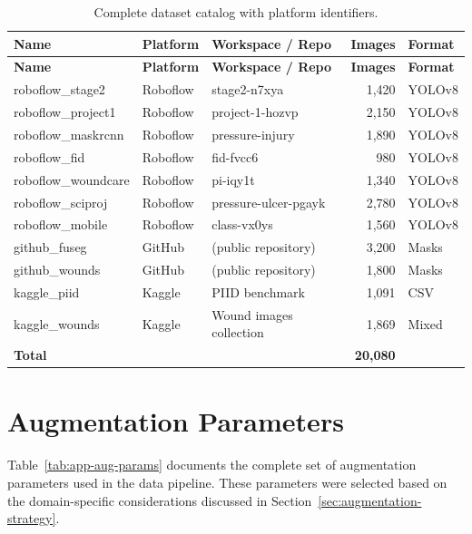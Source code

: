 \documentclass[a4paper,12pt,twoside]{report}
\begin{document}
\begin{longtable}{lllrl}
  \caption{Complete dataset catalog with platform identifiers.}
  \label{tab:app-catalog} \\
  \toprule
  \textbf{Name} & \textbf{Platform} & \textbf{Workspace / Repo} &
    \textbf{Images} & \textbf{Format} \\
  \midrule
  \endfirsthead
  \toprule
  \textbf{Name} & \textbf{Platform} & \textbf{Workspace / Repo} &
    \textbf{Images} & \textbf{Format} \\
  \midrule
  \endhead
  \bottomrule
  \endfoot
  roboflow\_stage2   & Roboflow & stage2-n7xya            & 1{,}420 & YOLOv8 \\
  roboflow\_project1 & Roboflow & project-1-hozvp         & 2{,}150 & YOLOv8 \\
  roboflow\_maskrcnn & Roboflow & pressure-injury         & 1{,}890 & YOLOv8 \\
  roboflow\_fid      & Roboflow & fid-fvcc6               & 980     & YOLOv8 \\
  roboflow\_woundcare & Roboflow & pi-iqy1t               & 1{,}340 & YOLOv8 \\
  roboflow\_sciproj  & Roboflow & pressure-ulcer-pgayk    & 2{,}780 & YOLOv8 \\
  roboflow\_mobile   & Roboflow & class-vx0ys             & 1{,}560 & YOLOv8 \\
  github\_fuseg      & GitHub   & (public repository)     & 3{,}200 & Masks  \\
  github\_wounds     & GitHub   & (public repository)     & 1{,}800 & Masks  \\
  kaggle\_piid       & Kaggle   & PIID benchmark          & 1{,}091 & CSV    \\
  kaggle\_wounds     & Kaggle   & Wound images collection & 1{,}869 & Mixed  \\
  \midrule
  \textbf{Total}     &          &                         & \textbf{20{,}080} & \\
\end{longtable}

\chapter{Augmentation Parameters}
\label{app:augmentation-params}

Table~\ref{tab:app-aug-params} documents the complete set of augmentation
parameters used in the data pipeline. These parameters were selected based on the
domain-specific considerations discussed in Section~\ref{sec:augmentation-strategy}.
\end{document}
